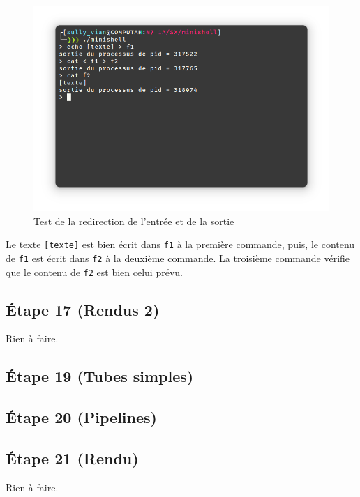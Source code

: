 \documentclass{article}
\begin{document}
\begin{figure}[H]
    \centering
    \includegraphics[width=\textwidth]{./resources/E16.png}
    \caption{Test de la redirection de l'entrée et de la sortie}
    \label{fig:E16}
\end{figure}

Le texte \texttt{[texte]} est bien écrit dans \texttt{f1} à la première commande, puis, le contenu de \texttt{f1} est écrit dans \texttt{f2} à la deuxième commande. La troisième commande vérifie que le contenu de \texttt{f2} est bien celui prévu.

\subsection*{Étape 17 (Rendus 2)}

Rien à faire.

\subsection*{Étape 19 (Tubes simples)}

\subsection*{Étape 20 (Pipelines)}

\subsection*{Étape 21 (Rendu)}

Rien à faire.
\end{document}
